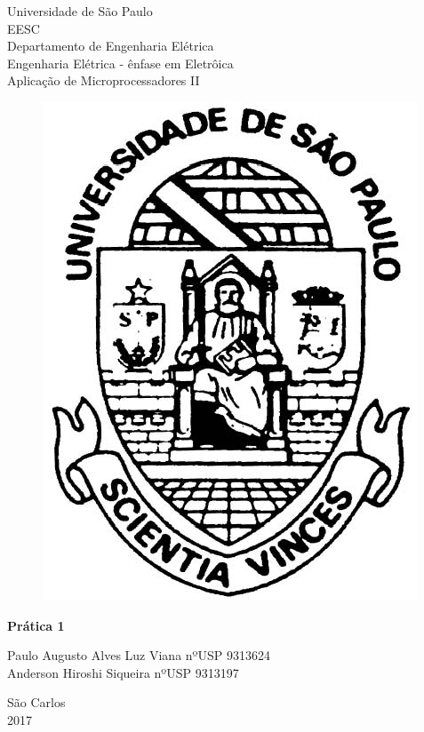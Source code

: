 \documentclass[
    a4paper,
    brazil
    ]{article}
\begin{document}
\begin{titlepage} %
\begin{center} %
{\large Universidade de São Paulo}\\[0.2cm] %
{\large EESC}\\[0.2cm] %
{\large Departamento de Engenharia Elétrica}\\[0.2cm]
{\large Engenharia Elétrica - ênfase em Eletrôica}\\[2.5cm]
{\huge Aplicação de Microprocessadores II}\\[3.1cm]
\begin{figure}[h]
    \includegraphics[scale=3]
    {imagens/usp.jpg}
    \centering
\end{figure}
{\bf \huge Prática 1}\\ %
\end{center} %
{\centering
\large Paulo Augusto Alves Luz Viana    nºUSP 9313624\\Anderson Hiroshi Siqueira    nºUSP 9313197\\}%

\begin{center}
{\large São Carlos}\\[0.2cm]
{\large 2017}
\end{center}
\end{titlepage} %
\end{document}
